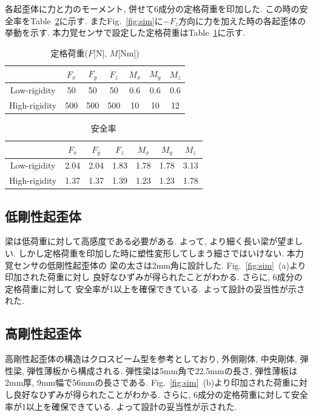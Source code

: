 各起歪体に力と力のモーメント, 併せて6成分の定格荷重を印加した. 
この時の安全率をTable~\ref{tb:anzen}に示す. 
またFig.~\ref{fig:sim}に$-F_z$方向に力を加えた時の各起歪体の挙動を示す.
本力覚センサで設定した定格荷重はTable~\ref{tb:kajuu}に示す. 
\begin{table}[h]
  \caption{定格荷重($F$[N], $M$[Nm])}\label{tb:kajuu}
  \begin{center}
   \begin{tabular}{ c c c c c c c }
    \hline
     & $F_x$ & $F_y$ & $F_z$ & $M_x$ & $M_y$ & $M_z$  \\
    \hline
    Low-rigidity & 50 & 50 & 50 & 0.6 & 0.6 & 0.6  \\
    \hline
    High-rigidity & 500 & 500 & 500 & 10 & 10 & 12  \\
    \hline   
   \end{tabular}
  \end{center}
 \end{table}
\begin{table}[h]
  \caption{安全率\label{tb:anzen}}
  \begin{center}
   \begin{tabular}{ c c c c c c c }
    \hline
     & $F_x$ & $F_y$ & $F_z$ & $M_x$ & $M_y$ & $M_z$  \\
    \hline
    Low-rigidity & 2.04 & 2.04 & 1.83 & 1.78 & 1.78 & 3.13  \\
    \hline
    High-rigidity & 1.37 & 1.37 & 1.39 & 1.23 & 1.23 & 1.78  \\
    \hline   
   \end{tabular}
  \end{center}
 \end{table}
\subsection*{低剛性起歪体}
梁は低荷重に対して高感度である必要がある. よって, より細く長い梁が望ましい. 
しかし定格荷重を印加した時に塑性変形してしまう細さではいけない. 本力覚センサの低剛性起歪体の
梁の太さは2mm角に設計した. Fig.~\ref{fig:sim}~(a)より印加された荷重に対し
良好なひずみが得られたことがわかる. さらに, 6成分の定格荷重に対して
安全率が1以上を確保できている.
よって設計の妥当性が示された. 

\subsection*{高剛性起歪体}
高剛性起歪体の構造はクロスビーム型を参考としており,
外側剛体, 中央剛体, 弾性梁, 弾性薄板から構成される. 
弾性梁は5mm角で22.5mmの長さ, 弾性薄板は2mm厚, 9mm幅で56mmの長さである. 
Fig.~\ref{fig:sim}~(b)より印加された荷重に対し良好なひずみが得られたことがわかる. 
さらに, 6成分の定格荷重に対して安全率が1以上を確保できている. 
よって設計の妥当性が示された. 

